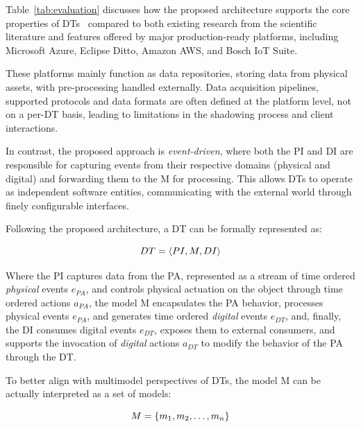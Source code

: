 Table~\ref{tab:evaluation} discusses how the proposed architecture supports the core properties of \acp{DT}~\cite{dt-IoT-context-Minerva-2020} compared to both existing research from the scientific literature and features offered by major production-ready platforms, including Microsoft Azure, Eclipse Ditto, Amazon AWS, and Bosch IoT Suite.

These platforms mainly function as data repositories, storing data from physical assets, with pre-processing handled externally.
Data acquisition pipelines, supported protocols and data formats are often defined at the platform level, not on a per-\ac{DT} basis, leading to limitations in the shadowing process and client interactions.

In contrast, the proposed approach is \emph{event-driven}, where both the \ac{PI} and \ac{DI} are responsible for capturing events from their respective domains (physical and digital) and forwarding them to the \ac{M} for processing. This allows \acp{DT} to operate as independent software entities, communicating with the external world through finely configurable interfaces.

Following the proposed architecture, a \ac{DT} can be formally represented as:

\begin{equation} 
\label{eq:dt_basic_model}
        DT = \langle PI, M, DI \rangle\\
\end{equation}

Where the \ac{PI} captures data from the \acf{PA}, represented as a stream of time ordered \emph{physical} events $e_{PA}$, and controls physical actuation on the object through time ordered actions $a_{PA}$, 
%
the model \ac{M} encapsulates the \ac{PA} behavior, processes physical events $e_{PA}$, and generates time ordered \emph{digital} events $e_{DT}$,
%
and, finally, the \ac{DI} consumes digital events $e_{DT}$, exposes them to external consumers, and supports the invocation of \emph{digital} actions $a_{DT}$ to modify the behavior of the \ac{PA} through the \ac{DT}.

To better align with multimodel perspectives of \acp{DT}, the model \ac{M} can be actually interpreted as a set of models:

\begin{equation}\label{eq:multi_model}
        M = \{ m_{1}, m_{2}, \dots, m_{n} \} \\
\end{equation}


